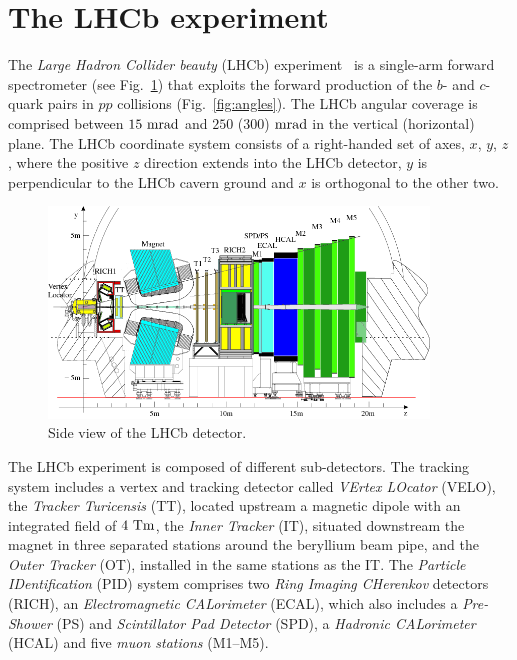 \section{The LHCb experiment}
\label{sec:lhcb}

The \emph{Large Hadron Collider beauty} (LHCb) experiment~\cite{LHCb-DP-2014-002} is a single-arm forward spectrometer (see Fig.~\ref{fig:detector}) that exploits the forward production
of the $b$- and $c$- quark pairs in $pp$ collisions (Fig.~\ref{fig:angles}). The LHCb angular coverage is comprised between $15~\rm mrad$ and $250$ ($300$) $\rm mrad$ in the vertical (horizontal) plane.
The LHCb coordinate system consists of a right-handed set of axes, $x$, $y$, $z$, where the positive $z$ direction extends into the LHCb detector, $y$ is perpendicular to the LHCb cavern ground and $x$ is orthogonal to the other two.

\begin{figure}[htbp]
  \begin{center}
    \includegraphics[width=0.9\textwidth]{02LHCb/figs/detector.png}
  \end{center}
  \vspace{-2mm}
  \caption{Side view of the LHCb detector.}
  \label{fig:detector}
\end{figure}

The LHCb experiment is composed of different sub-detectors. The tracking system includes a vertex and tracking detector called \emph{VErtex LOcator} (VELO), the \emph{Tracker Turicensis} (TT), located upstream a magnetic dipole with an integrated field of $4~\rm Tm$, the \emph{Inner Tracker} (IT), situated downstream the magnet in three separated stations around the beryllium beam pipe, and the \emph{Outer Tracker} (OT), installed in the same stations as the IT. The \emph{Particle IDentification} (PID) system comprises two \emph{Ring Imaging CHerenkov} detectors (RICH), an \emph{Electromagnetic CALorimeter} (ECAL), which also includes a \emph{Pre-Shower} (PS) and \emph{Scintillator Pad Detector} (SPD), a \emph{Hadronic CALorimeter} (HCAL) and five \emph{muon stations} (M1--M5).

